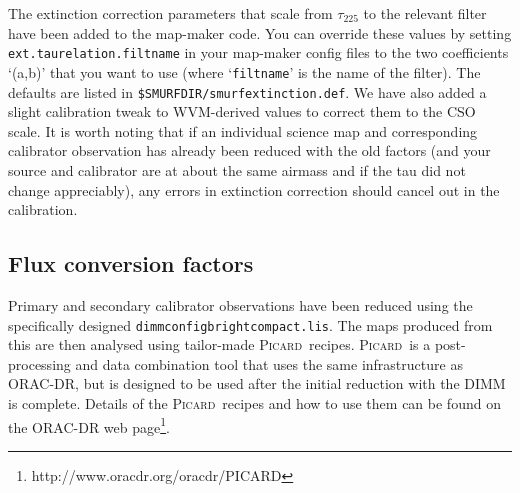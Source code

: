 \documentclass[twoside,11pt]{article}
\newcommand{\htmladdnormallinkfoot}[2]{#1\footnote{#2}}
\newcommand{\xref}[3]{#1}
\renewcommand{\_}{\texttt{\symbol{95}}}
\newcommand{\picard}{\xref{\textsc{Picard}}{sun231}{}}
\newcommand{\param}[1]{\texttt{#1}}
\begin{document}
The extinction correction parameters that scale from $\tau_{225}$ to
the relevant filter have been added to the map-maker code. You can
override these values by setting \param{ext.taurelation.filtname} in
your map-maker config files to the two coefficients `(a,b)' that you
want to use (where `\texttt{filtname}' is the name of the filter). The
defaults are listed in \texttt{\$SMURF\_DIR/smurf\_extinction.def}. We have
also added a slight calibration tweak to WVM-derived values to correct
them to the CSO scale. It is worth noting that if an individual
science map and corresponding calibrator observation has already been
reduced with the old factors (and your source and calibrator are at
about the same airmass and if the tau did not change appreciably), any
errors in extinction correction should cancel out in the calibration.


\subsection{Flux conversion factors}
\label{sec:fcf}

Primary and secondary calibrator observations have been reduced using
the specifically designed
\texttt{dimmconfig\_bright\_compact.lis}. The maps produced from this
are then analysed using tailor-made \picard\ recipes. \picard\ is a
post-processing and data combination tool that uses the same
infrastructure as ORAC-DR, but is designed to be used after the
initial reduction with the DIMM is complete. Details of the \picard\
recipes and how to use them can be found on \htmladdnormallinkfoot{the
  ORAC-DR web page}{http://www.oracdr.org/oracdr/PICARD}.
\end{document}
